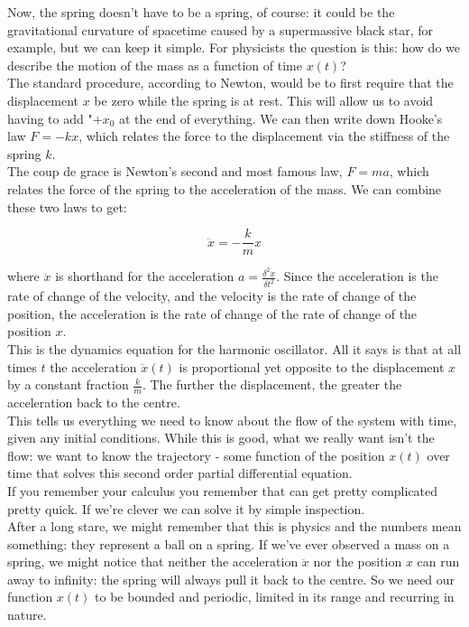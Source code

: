 \documentclass[krantz1,ChapterTOCs]{krantz}
\begin{document}
Now, the spring doesn't have to be a spring, of course: it could be the gravitational curvature of spacetime caused by a supermassive black star, for example, but we can keep it simple. For physicists the question is this: how do we describe the motion of the mass as a function of time $x(t)$?\\

The standard procedure, according to Newton, would be to first require that the displacement $x$ be zero while the spring is at rest. This will allow us to avoid having to add "$+x_0$ at the end of everything. We can then write down Hooke's law $F=-kx$, which relates the force to the displacement via the stiffness of the spring $k$.\\

The coup de grace is Newton's second and most famous law, $F=ma$, which relates the force of the spring to the acceleration of the mass. We can combine these two laws to get:

$$\ddot{x} = -\frac{k}{m}x$$

where $\ddot{x}$ is shorthand for the acceleration $a=\frac{\delta^2x}{\delta t^2}$. Since the acceleration is the rate of change of the velocity, and the velocity is the rate of change of the position, the acceleration is the rate of change of the rate of change of the position $x$.\\

This is the dynamics equation for the harmonic oscillator. All it says is that at all times $t$ the acceleration $\ddot{x}(t)$ is proportional yet opposite to the displacement $x$ by a constant fraction $\frac{k}{m}$. The further the displacement, the greater the acceleration back to the centre.\\

This tells us everything we need to know about the flow of the system with time, given any initial conditions. While this is good, what we really want isn't the flow: we want to know the trajectory - some function of the position $x(t)$ over time that solves this second order partial differential equation.\\

If you remember your calculus you remember that can get pretty complicated pretty quick. If we're clever we can solve it by simple inspection.\\

After a long stare, we might remember that this is physics and the numbers mean something: they represent a ball on a spring. If we've ever observed a mass on a spring, we might notice that neither the acceleration $\ddot{x}$ nor the position $x$ can run away to infinity: the spring will always pull it back to the centre. So we need our function $x(t)$ to be bounded and periodic, limited in its range and recurring in nature.\\
\end{document}

